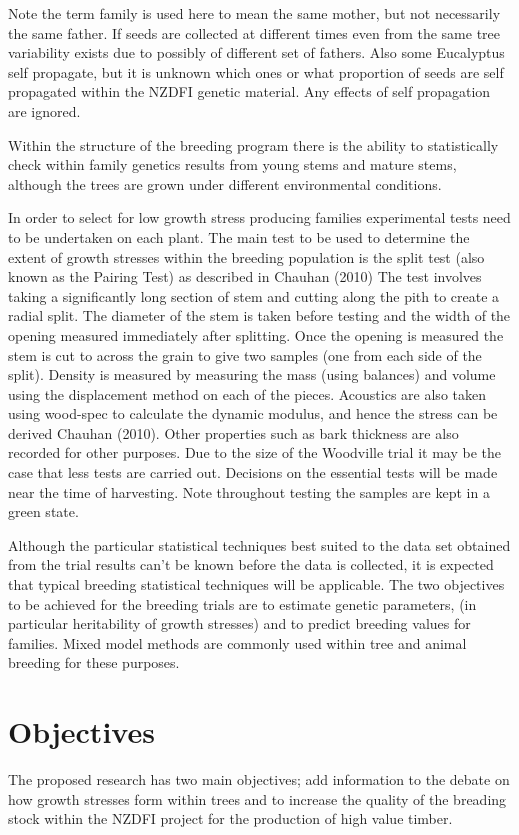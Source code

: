 \documentclass{article}
\begin{document}
Note the term family is used here to mean the same mother, but not necessarily
the same father. If seeds are collected at different times even from the same
tree variability exists due to possibly of different set of fathers. Also some
Eucalyptus self propagate, but it is unknown which ones or what proportion of
seeds are self propagated within the NZDFI genetic material. Any effects of self
propagation are ignored.

Within the structure of the breeding program there is the ability to
statistically check within family genetics results from young stems and mature
stems, although the trees are grown under different environmental conditions.

In order to select for low growth stress producing families experimental tests
need to be undertaken on each plant. The main test to be used to determine the
extent of growth stresses within the breeding population is the split test (also
known as the Pairing Test) as described in Chauhan (2010) The test involves
taking a significantly long section of stem and cutting along the pith to create
a radial split. The diameter of the stem is taken before testing and the width
of the opening measured immediately after splitting. Once the opening is
measured the stem is cut to across the grain to give two samples (one from each
side of the split). Density is measured by measuring the mass (using balances)
and volume using the displacement method on each of the pieces. Acoustics are
also taken using wood-spec to calculate the dynamic modulus, and hence the
stress can be derived Chauhan (2010). Other properties such as bark thickness
are also recorded for other purposes. Due to the size of the Woodville trial it
may be the case that less tests are carried out. Decisions on the essential
tests will be made near the time of harvesting. Note throughout testing the
samples are kept in a green state.

Although the particular statistical techniques best suited to the data set
obtained from the trial results can’t be known before the data is collected, it
is expected that typical breeding statistical techniques will be applicable. The
two objectives to be achieved for the breeding trials are to estimate genetic
parameters, (in particular heritability of growth stresses) and to predict
breeding values for families. Mixed model methods are commonly used within tree
and animal breeding for these purposes.


\section{Objectives}
The proposed research has two main objectives; add information to the
debate on how growth stresses form within trees and to increase the quality of
the breading stock within the NZDFI project for the production of high value
timber.
\end{document}
